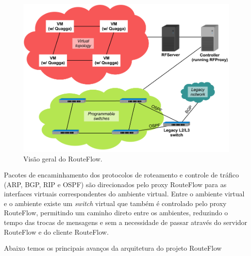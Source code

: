 \begin{figure}[h]
\centering
\includegraphics[width=160mm]{visaoGeralRouteFlow.png}
\caption{Visão geral do RouteFlow.}
\label{fig:visaoGeralRouteFlow} 
\end{figure}


Pacotes de encaminhamento dos protocolos de roteamento 
e controle de tráfico (ARP, BGP, RIP e OSPF) são direcionados
pelo proxy RouteFlow para as interfaces virtuais correspondentes do
ambiente virtual. Entre o ambiente virtual e o ambiente existe
um \textit{switch} virtual que também é controlado pelo proxy RouteFlow,
permitindo um caminho direto entre os ambientes, reduzindo 
o tempo das trocas de mensagens e sem a necessidade de passar
através do servidor RouteFlow e do cliente RouteFlow.

Abaixo temos os principais avanços da arquitetura do projeto
RouteFlow

